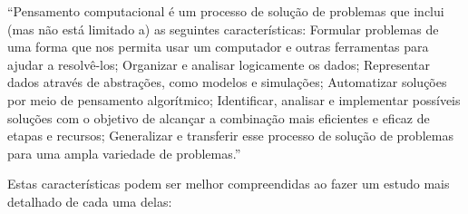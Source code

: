 \documentclass[12pt, openright, a4paper, brazil, english, french, spanish, bibjustif, openany, oneside]{abntex2}
\begin{document}
\begin{citacao}

``Pensamento computacional é um processo de solução de problemas que inclui (mas não está limitado a) as seguintes características: Formular problemas de uma forma que nos permita usar um computador e outras ferramentas para ajudar a resolvê-los; Organizar e analisar logicamente os dados; Representar dados através de abstrações, como modelos e simulações; Automatizar soluções por meio de pensamento algorítmico; Identificar, analisar e implementar possíveis soluções com o objetivo de alcançar a combinação mais eficientes e eficaz de etapas e recursos; Generalizar e transferir esse processo de solução de problemas para uma ampla variedade de problemas.''\cite{iste/csta}

\end{citacao}

Estas características podem ser melhor compreendidas ao fazer um estudo mais detalhado de cada uma delas:
\end{document}
